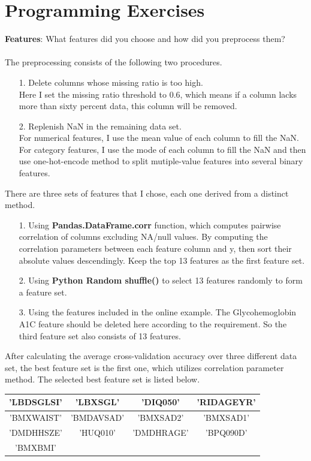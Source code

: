 \documentclass{article}
\begin{document}
        \section{Programming Exercises}
        \textbf{Features}: What features did you choose and how did you preprocess them?\\\\
        The preprocessing consists of the following two procedures.
        \begin{itemize}
        \item[1.]Delete columns whose missing ratio is too high. \\
        Here I set the missing ratio threshold to 0.6, which means if a column lacks more than sixty percent data, this column will be removed.
        \item[2.]Replenish NaN in the remaining data set.\\ 
        For numerical features, I use the mean value of each column to fill the NaN.\\
        For category features, I use the mode of each column to fill the NaN and then use one-hot-encode method to split mutiple-value features into several binary features.
        \end{itemize}
        There are three sets of features that I chose, each one derived from a distinct method.
        \begin{itemize}
        	\item[1.]Using \textbf{Pandas.DataFrame.corr} function, which computes pairwise correlation of columns excluding NA/null values. By computing the correlation parameters between each feature column and y, then sort their absolute values descendingly. Keep the top 13 features as the first feature set.
        	\item[2.]Using \textbf{Python Random shuffle()} to select 13 features randomly to form a feature set.
        	\item[3.]Using the features included in the online example. The Glycohemoglobin A1C feature should be deleted here according to the requirement. So the third feature set also consists of 13 features.
        \end{itemize}
        After calculating the average cross-validation accuracy over three different data set, the best feature set is the first one, which utilizes correlation parameter method. The selected best feature set is listed below.\\
        \begin{center}
        	\begin{tabular}{|c|c|c|c|}
        		\hline
        		'LBDSGLSI'&'LBXSGL'&'DIQ050'&'RIDAGEYR'\\
        		\hline
        		'BMXWAIST'&'BMDAVSAD'&'BMXSAD2'&'BMXSAD1'\\
        		\hline
        		'DMDHHSZE'&'HUQ010'&'DMDHRAGE'&'BPQ090D'\\
        		\hline
        		'BMXBMI'&&&\\
        		\hline
        	
        	\end{tabular}
        	
        \end{center}
		
\end{document}
